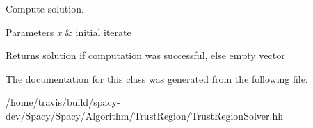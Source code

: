 \-Compute solution. 


\begin{DoxyParams}{\-Parameters}
{\em x} & initial iterate \\
\hline
\end{DoxyParams}
\begin{DoxyReturn}{\-Returns}
solution if computation was successful, else empty vector 
\end{DoxyReturn}


\-The documentation for this class was generated from the following file\-:\begin{DoxyCompactItemize}
\item 
/home/travis/build/spacy-\/dev/\-Spacy/\-Spacy/\-Algorithm/\-Trust\-Region/\-Trust\-Region\-Solver.\-hh\end{DoxyCompactItemize}
